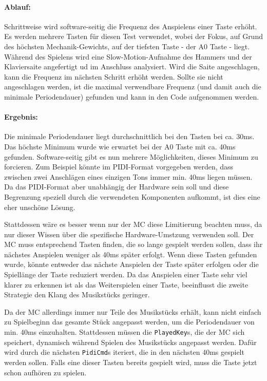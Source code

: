 \paragraph{Ablauf:}
Schrittweise wird software-seitig die Frequenz des Anspielens einer Taste erhöht.
Es werden mehrere Tasten für diesen Test verwendet, wobei der Fokus, auf Grund des höchsten Mechanik-Gewichts, auf der tiefsten Taste - der A0 Taste - liegt. %
Während des Spielens wird eine Slow-Motion-Aufnahme des Hammers und der Klaviersaite angefertigt ud im Anschluss analysiert.
Wird die Saite angeschlagen, kann die Frequenz im nächsten Schritt erhöht werden.
Sollte sie nicht angeschlagen werden, ist die maximal verwendbare Frequenz (und damit auch die minimale Periodendauer) gefunden und kann in den Code aufgenommen werden.

\paragraph{Ergebnis:}
Die minimale Periodendauer liegt durchschnittlich bei den Tasten bei ca. 30ms.
Das höchste Minimum wurde wie erwartet bei der A0 Taste mit ca. 40ms gefunden. \newline
Software-seitig gibt es nun mehrere Möglichkeiten, dieses Minimum zu forcieren.
Zum Beispiel könnte im \ac{PIDI}-Format vorgegeben werden, dass zwischen zwei Anschlägen eines einzigen Tons immer min. 40ms liegen müssen.
Da das \ac{PIDI}-Format aber unabhängig der Hardware sein soll und diese Begrenzung speziell durch die verwendeten Komponenten aufkommt, ist dies eine eher unschöne Lösung.

Stattdessen wäre es besser wenn nur der \ac{MC} diese Limitierung beachten muss, da nur dieser Wissen über die spezifische Hardware-Umstzung verwenden soll.
Der \ac{MC} muss entsprechend Tasten finden, die so lange gespielt werden sollen, dass ihr nächstes Anspielen weniger als 40ms später erfolgt.
Wenn diese Tasten gefunden wurde, könnte entweder das nächste Anspielen der Taste später erfolgen oder die Spiellänge der Taste reduziert werden.
Da das Anspielen einer Taste sehr viel klarer zu erkennen ist als das Weiterspielen einer Taste, beeinflusst die zweite Strategie den Klang des Musikstücks geringer.

Da der \ac{MC} allerdings immer nur Teile des Musikstücks erhält, kann nicht einfach zu Spielbeginn das gesamte Stück angepasst werden, um die Periodendauer von min. 40ms einzuhalten.
Stattdessen müssen die \lstinline|PlayedKey|s, die der \ac{MC} sich speichert, dynamisch während Spielen des Musikstücks angepasst werden.
Dafür wird durch die nächsten \lstinline|PidiCmd|s iteriert, die in den nächsten 40ms gespielt werden sollen. Falls eine dieser Tasten bereits gespielt wird, muss die Taste jetzt schon aufhören zu spielen.

